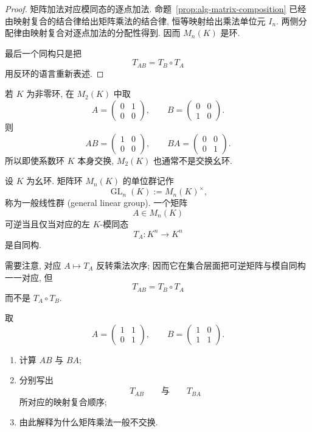 \documentclass[usesamecnt, thmcnt=section, lang=cn, newtx, 10pt, scheme=chinese]{elegantbook}
\begin{document}
\begin{proof}
矩阵加法对应模同态的逐点加法. 命题~\ref{prop:alg-matrix-composition} 已经由映射复合的结合律给出矩阵乘法的结合律, 恒等映射给出乘法单位元 $I_n$. 两侧分配律由映射复合对逐点加法的分配性得到. 因而 $M_n(K)$ 是环.

最后一个同构只是把
\[
 T_{AB}=T_B\circ T_A
\]
用反环的语言重新表述.
\end{proof}

\begin{instance}
若 $K$ 为非零环, 在 $M_2(K)$ 中取
\[
 A=\begin{pmatrix}0&1\\0&0\end{pmatrix},
 \qquad
 B=\begin{pmatrix}0&0\\1&0\end{pmatrix}.
\]
则
\[
 AB=\begin{pmatrix}1&0\\0&0\end{pmatrix},
 \qquad
 BA=\begin{pmatrix}0&0\\0&1\end{pmatrix}.
\]
所以即使系数环 $K$ 本身交换, $M_2(K)$ 也通常不是交换幺环.
\end{instance}

\begin{definition}[一般线性群]\label{def:alg-general-linear-group}
设 $K$ 为幺环. 矩阵环 $M_n(K)$ 的单位群记作
\[
 \operatorname{GL}_n(K):=M_n(K)^\times,
\]
称为{\color{blue}一般线性群 (general linear group)}. 一个矩阵
\[
 A\in M_n(K)
\]
可逆当且仅当对应的左 $K$-模同态
\[
 T_A:K^n\longrightarrow K^n
\]
是自同构.

需要注意, 对应 $A\mapsto T_A$ 反转乘法次序; 因而它在集合层面把可逆矩阵与模自同构一一对应, 但
\[
 T_{AB}=T_B\circ T_A
\]
而不是 $T_A\circ T_B$.
\end{definition}

\begin{exercise}\label{ex:alg-matrix-noncommutative}
取
\[
 A=\begin{pmatrix}1&1\\0&1\end{pmatrix},
 \qquad
 B=\begin{pmatrix}1&0\\1&1\end{pmatrix}.
\]
\begin{enumerate}[label=\rm(\arabic*)]
 \item 计算 $AB$ 与 $BA$;
 \item 分别写出
 \[
  T_{AB}
  \qquad\text{与}\qquad
  T_{BA}
 \]
 所对应的映射复合顺序;
 \item 由此解释为什么矩阵乘法一般不交换.
\end{enumerate}
\end{exercise}
\end{document}
